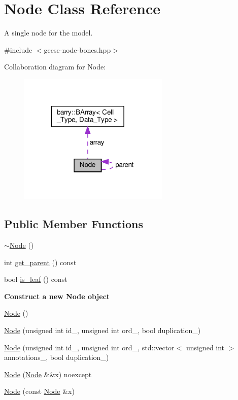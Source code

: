 \hypertarget{class_node}{}\section{Node Class Reference}
\label{class_node}


A single node for the model.  




{\ttfamily \#include $<$geese-\/node-\/bones.\+hpp$>$}



Collaboration diagram for Node\+:\nopagebreak
\begin{figure}[H]
\begin{center}
\leavevmode
\includegraphics[width=203pt]{class_node__coll__graph}
\end{center}
\end{figure}
\subsection*{Public Member Functions}
\begin{DoxyCompactItemize}
\item 
\hyperlink{class_node_aa0840c3cb5c7159be6d992adecd2097c}{$\sim$\+Node} ()
\item 
int \hyperlink{class_node_a661cb63a33e950b84c9c093c63d1ab63}{get\+\_\+parent} () const
\item 
bool \hyperlink{class_node_af7cc2d0f435e3bee4388a0e9ab42adb8}{is\+\_\+leaf} () const
\end{DoxyCompactItemize}
\begin{Indent}\textbf{ Construct a new Node object}\par
\begin{DoxyCompactItemize}
\item 
\hyperlink{class_node_ad7a34779cad45d997bfd6d3d8043c75f}{Node} ()
\item 
\hyperlink{class_node_a9983fdcbdddeae8862fbd266536f5cff}{Node} (unsigned int id\+\_\+, unsigned int ord\+\_\+, bool duplication\+\_\+)
\item 
\hyperlink{class_node_a0c9bb1827ebcdb298c05e9b9bf04aac8}{Node} (unsigned int id\+\_\+, unsigned int ord\+\_\+, std\+::vector$<$ unsigned int $>$ annotations\+\_\+, bool duplication\+\_\+)
\item 
\hyperlink{class_node_a7541702bb12f9dae3f6cbf83bddaed2a}{Node} (\hyperlink{class_node}{Node} \&\&x) noexcept
\item 
\hyperlink{class_node_ac9e4a04860b442c2034e24aa058db129}{Node} (const \hyperlink{class_node}{Node} \&x)
\end{DoxyCompactItemize}
\end{Indent}
